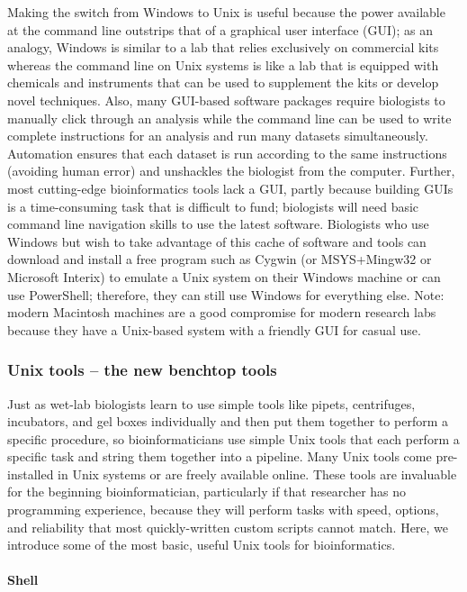 \documentclass[ChapterTOCs,krantz2]{krantz} %
\begin{document}
Making the switch from Windows to Unix
is useful because the power available at the command line outstrips that
of a graphical user interface (GUI); as an analogy, Windows is similar to a lab
that relies exclusively on commercial kits whereas the command line on Unix
systems is like a lab that is equipped with chemicals and instruments that can be used 
to supplement the kits or develop novel techniques.  Also, many
GUI-based software packages require biologists to manually click through an analysis
while the command line can be used to write complete instructions for an
analysis and run many datasets simultaneously.   Automation ensures 
that each dataset is run according to the
same instructions (avoiding human error) and unshackles the biologist from
the computer.  Further, most
cutting-edge bioinformatics tools lack a GUI,
partly because building GUIs is a time-consuming task that is
difficult to fund; biologists will need
basic command line navigation skills to use the latest software.  Biologists
who use Windows but wish to take advantage of this cache of software and tools
can download and install a free program such as Cygwin (or MSYS+Mingw32 or 
Microsoft Interix) to emulate a Unix system
on their Windows machine or can use PowerShell; 
therefore, they can still use Windows for everything
else. Note: modern Macintosh machines are a
good compromise for modern research labs because they 
have a Unix-based system with a friendly GUI for casual use.

\subsubsection{Unix tools -- the new benchtop tools}

Just as wet-lab biologists learn to use simple tools like pipets, centrifuges,
incubators, and gel boxes individually and then put them together to perform a
specific procedure, so bioinformaticians use simple Unix tools
that each perform a specific task and string them together into a pipeline.
Many Unix tools come pre-installed in Unix systems or are freely
available online. These tools are invaluable for the beginning
bioinformatician, particularly if that researcher has no programming experience, 
because they will perform tasks with speed, options, and
reliability that most quickly-written custom scripts cannot match.  Here, we
introduce some of the most basic, useful Unix tools for bioinformatics.

\paragraph{Shell}
\end{document}
